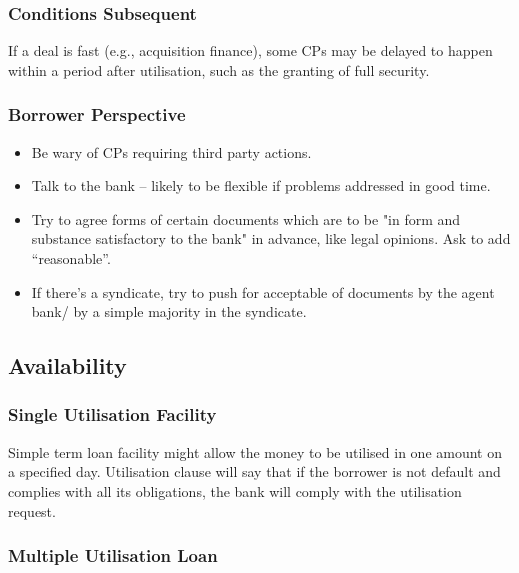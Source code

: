 \documentclass[
]{article}
\providecommand{\tightlist}{%
  \setlength{\itemsep}{0pt}\setlength{\parskip}{0pt}}
\begin{document}
\hypertarget{conditions-subsequent}{%
\subsubsection{Conditions Subsequent}\label{conditions-subsequent}}

If a deal is fast (e.g., acquisition finance), some CPs may be delayed
to happen within a period after utilisation, such as the granting of
full security.

\hypertarget{borrower-perspective}{%
\subsubsection{Borrower Perspective}\label{borrower-perspective}}

\begin{itemize}
\tightlist
\item
  Be wary of CPs requiring third party actions.
\item
  Talk to the bank -- likely to be flexible if problems addressed in
  good time.
\item
  Try to agree forms of certain documents which are to be "in form and
  substance satisfactory to the bank" in advance, like legal opinions.
  Ask to add ``reasonable''.
\item
  If there's a syndicate, try to push for acceptable of documents by the
  agent bank/ by a simple majority in the syndicate.
\end{itemize}

\hypertarget{availability}{%
\subsection{Availability}\label{availability}}

\hypertarget{single-utilisation-facility}{%
\subsubsection{Single Utilisation
Facility}\label{single-utilisation-facility}}

Simple term loan facility might allow the money to be utilised in one
amount on a specified day. Utilisation clause will say that if the
borrower is not default and complies with all its obligations, the bank
will comply with the utilisation request.

\hypertarget{multiple-utilisation-loan}{%
\subsubsection{Multiple Utilisation
Loan}\label{multiple-utilisation-loan}}
\end{document}
